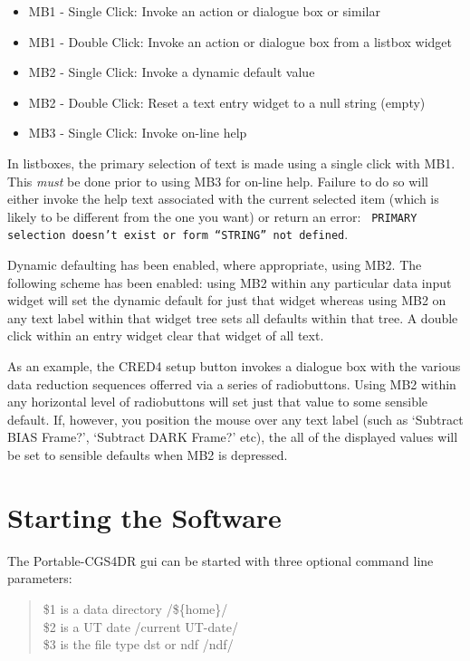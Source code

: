 \documentclass[a4paper]{book}
\renewcommand{\_}{{\tt\char'137}}
\begin{document}
\begin{itemize}
\item MB1 - Single Click: Invoke an action or dialogue box or similar 
\item MB1 - Double Click: Invoke an action or dialogue box from a listbox widget
\item MB2 - Single Click: Invoke a dynamic default value 
\item MB2 - Double Click: Reset a text entry widget to a null string (empty) 
\item MB3 - Single Click: Invoke on-line help 
\end{itemize}

In listboxes, the primary selection of text is made using a single click with MB1.
This {\em must} be done prior to using MB3 for on-line help. Failure to do so will 
either invoke the help text associated with the current selected item (which is 
likely to be different from the one you want) or return an error: {\tt
PRIMARY selection doesn't exist or form ``STRING'' not defined}.

Dynamic defaulting has been enabled, where appropriate, using MB2. The following
scheme has been enabled: using MB2 within any particular data input widget will set the
dynamic default for just that widget whereas using MB2 on any text label within
that widget tree sets all defaults within that tree. A double click within an entry
widget clear that widget of all text.

As an example, the CRED4 setup button invokes a dialogue box with the various
data reduction sequences offerred via a series of radiobuttons. Using MB2
within any horizontal level of radiobuttons will set just that value to some
sensible default. If, however, you position the mouse over any text label
(such as `Subtract BIAS Frame?', `Subtract DARK Frame?' etc), the all of the
displayed values will be set to sensible defaults when MB2 is depressed.

\section{Starting the Software}
The Portable-CGS4DR {\sc gui} can be started with three optional command line
parameters: 

\begin{minipage}{120mm}
\begin{quote}
  \$1 is a data directory \hfill /\$\{home\}/ \\
  \$2 is a UT date \hfill /current UT-date/ \\
  \$3 is the file type {\sc dst} or {\sc ndf} \hfill /ndf/
\end{quote}
\end{minipage}
\end{document}
